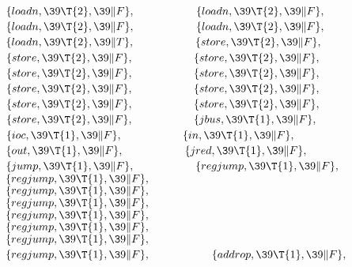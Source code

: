 ${}\hbox{\>}\{\\{loadn},\39\T{2},\39\|F\},{}$\6
${}\hbox{\>}\{\\{loadn},\39\T{2},\39\|F\},{}$\6
${}\hbox{\>}\{\\{loadn},\39\T{2},\39\|F\},{}$\6
${}\hbox{\>}\{\\{loadn},\39\T{2},\39\|F\},{}$\6
${}\hbox{\>}\{\\{loadn},\39\T{2},\39\|T\},{}$\6
${}\hbox{\>}\{\\{store},\39\T{2},\39\|F\},{}$\6
${}\hbox{\>}\{\\{store},\39\T{2},\39\|F\},{}$\6
${}\hbox{\>}\{\\{store},\39\T{2},\39\|F\},{}$\6
${}\hbox{\>}\{\\{store},\39\T{2},\39\|F\},{}$\6
${}\hbox{\>}\{\\{store},\39\T{2},\39\|F\},{}$\6
${}\hbox{\>}\{\\{store},\39\T{2},\39\|F\},{}$\6
${}\hbox{\>}\{\\{store},\39\T{2},\39\|F\},{}$\6
${}\hbox{\>}\{\\{store},\39\T{2},\39\|F\},{}$\6
${}\hbox{\>}\{\\{store},\39\T{2},\39\|F\},{}$\6
${}\hbox{\>}\{\\{store},\39\T{2},\39\|F\},{}$\6
${}\hbox{\>}\{\\{jbus},\39\T{1},\39\|F\},{}$\6
${}\hbox{\>}\{\\{ioc},\39\T{1},\39\|F\},{}$\6
${}\hbox{\>}\{\\{in},\39\T{1},\39\|F\},{}$\6
${}\hbox{\>}\{\\{out},\39\T{1},\39\|F\},{}$\6
${}\hbox{\>}\{\\{jred},\39\T{1},\39\|F\},{}$\6
${}\hbox{\>}\{\\{jump},\39\T{1},\39\|F\},{}$\6
${}\hbox{\>}\{\\{regjump},\39\T{1},\39\|F\},{}$\6
${}\hbox{\>}\{\\{regjump},\39\T{1},\39\|F\},{}$\6
${}\hbox{\>}\{\\{regjump},\39\T{1},\39\|F\},{}$\6
${}\hbox{\>}\{\\{regjump},\39\T{1},\39\|F\},{}$\6
${}\hbox{\>}\{\\{regjump},\39\T{1},\39\|F\},{}$\6
${}\hbox{\>}\{\\{regjump},\39\T{1},\39\|F\},{}$\6
${}\hbox{\>}\{\\{regjump},\39\T{1},\39\|F\},{}$\6
${}\hbox{\>}\{\\{regjump},\39\T{1},\39\|F\},{}$\6
${}\hbox{\>}\{\\{addrop},\39\T{1},\39\|F\},{}$\6
